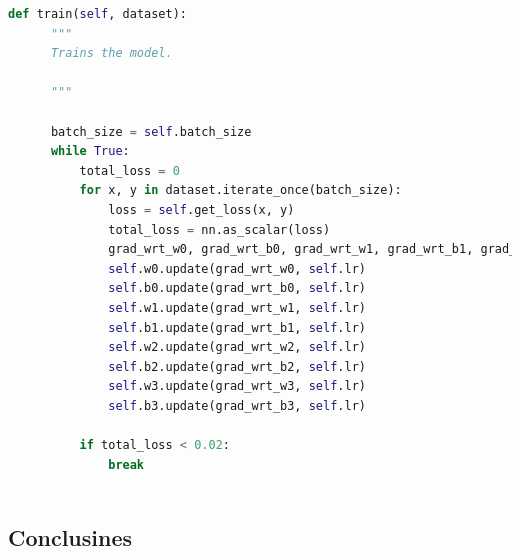 \documentclass{report}
\begin{document}
\begin{lstlisting}[language=Python, caption=Implementación de la regresión no lineal]
  def train(self, dataset):
      """
      Trains the model.
      
      """
      
      batch_size = self.batch_size
      while True:
          total_loss = 0
          for x, y in dataset.iterate_once(batch_size):
              loss = self.get_loss(x, y)
              total_loss = nn.as_scalar(loss)
              grad_wrt_w0, grad_wrt_b0, grad_wrt_w1, grad_wrt_b1, grad_wrt_w2, grad_wrt_b2, grad_wrt_w3, grad_wrt_b3 = nn.gradients(loss, [self.w0, self.b0, self.w1, self.b1, self.w2, self.b2, self.w3, self.b3])
              self.w0.update(grad_wrt_w0, self.lr)
              self.b0.update(grad_wrt_b0, self.lr)
              self.w1.update(grad_wrt_w1, self.lr)
              self.b1.update(grad_wrt_b1, self.lr)
              self.w2.update(grad_wrt_w2, self.lr)
              self.b2.update(grad_wrt_b2, self.lr)
              self.w3.update(grad_wrt_w3, self.lr)
              self.b3.update(grad_wrt_b3, self.lr)
          
          if total_loss < 0.02:
              break
      
        \end{lstlisting}
        \clearpage
      \subsection*{Conclusines}
\end{document}
